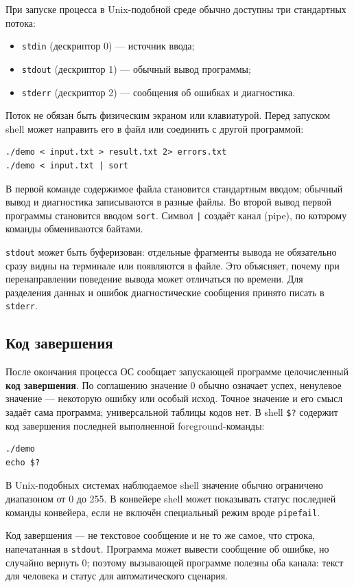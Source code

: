 При запуске процесса в Unix-подобной среде обычно доступны три стандартных
потока:
\begin{itemize}
  \item \texttt{stdin} (дескриптор 0) --- источник ввода;
  \item \texttt{stdout} (дескриптор 1) --- обычный вывод программы;
  \item \texttt{stderr} (дескриптор 2) --- сообщения об ошибках и диагностика.
\end{itemize}

Поток не обязан быть физическим экраном или клавиатурой. Перед запуском shell
может направить его в файл или соединить с другой программой:
\begin{lstlisting}
./demo < input.txt > result.txt 2> errors.txt
./demo < input.txt | sort
\end{lstlisting}
В первой команде содержимое файла становится стандартным вводом; обычный вывод
и диагностика записываются в разные файлы. Во второй вывод первой программы
становится вводом \texttt{sort}. Символ \texttt{|} создаёт канал (pipe), по
которому команды обмениваются байтами.

\texttt{stdout} может быть буферизован: отдельные фрагменты вывода не обязательно
сразу видны на терминале или появляются в файле. Это объясняет, почему при
перенаправлении поведение вывода может отличаться по времени. Для разделения
данных и ошибок диагностические сообщения принято писать в \texttt{stderr}.

\subsection{Код завершения}

После окончания процесса ОС сообщает запускающей программе целочисленный
\textbf{код завершения}. По соглашению значение 0 обычно означает успех,
ненулевое значение --- некоторую ошибку или особый исход. Точное значение и
его смысл задаёт сама программа; универсальной таблицы кодов нет. В shell
\texttt{\$?} содержит код завершения последней выполненной foreground-команды:
\begin{lstlisting}
./demo
echo $?
\end{lstlisting}
В Unix-подобных системах наблюдаемое shell значение обычно ограничено диапазоном
от 0 до 255. В конвейере shell может показывать статус последней команды
конвейера, если не включён специальный режим вроде \texttt{pipefail}.

Код завершения --- не текстовое сообщение и не то же самое, что строка,
напечатанная в \texttt{stdout}. Программа может вывести сообщение об ошибке,
но случайно вернуть 0; поэтому вызывающей программе полезны оба канала:
текст для человека и статус для автоматического сценария.

